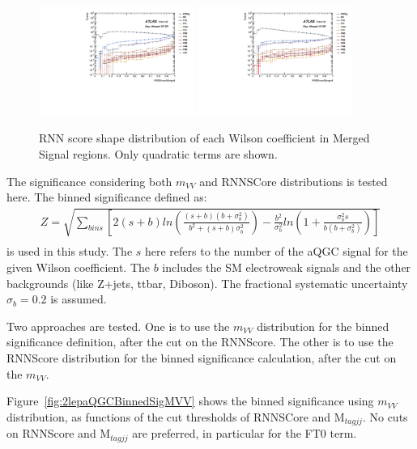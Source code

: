 \begin{figure}[ht]
    \centering
    \includegraphics[width=0.45\textwidth]{figures/aQGC/RNNScoreMerged_SR_HP_aQGC.pdf}
    \includegraphics[width=0.45\textwidth]{figures/aQGC/RNNScoreMerged_SR_LP_aQGC.pdf}
    \caption{RNN score shape distribution of each Wilson coefficient in Merged Signal regions. Only quadratic terms are shown.}
    \label{fig:2lepaQGCshapeRNN}
\end{figure}

The significance considering both $m_{VV}$ and RNNSCore distributions is tested here.
The binned significance defined as:
%
\begin{eqnarray*}
  Z = \sqrt{\sum_{bins}\left[2(s + b)ln\left(\frac{(s + b)(b+\sigma^2_{b})}{b^2+(s+b)\sigma^2_{b}}\right) - \frac{b^2}{\sigma^2_{b}}ln\left(1+\frac{\sigma^2_{b}s}{b(b+\sigma^2_{b})}\right)\right]} \\
\end{eqnarray*}
%
is used in this study.
The $s$ here refers to the number of the aQGC signal for the given Wilson coefficient.
The $b$ includes the SM electroweak signals and the other backgrounds (like Z+jets, ttbar, Diboson).
The fractional systematic uncertainty $\sigma_{b} = 0.2$ is assumed.

Two approaches are tested.
One is to use the $m_{VV}$ distribution for the binned significance definition, after the cut on the RNNScore.
The other is to use the RNNScore distribution for the binned significance calculation, after the cut on the $m_{VV}$.

Figure~\ref{fig:2lepaQGCBinnedSigMVV} shows the binned significance using $m_{VV}$ distribution,
as functions of the cut thresholds of RNNSCore and $\mathrm{M}_{tagjj}$.
No cuts on RNNScore and $\mathrm{M}_{tagjj}$ are preferred, in particular for the FT0 term.

